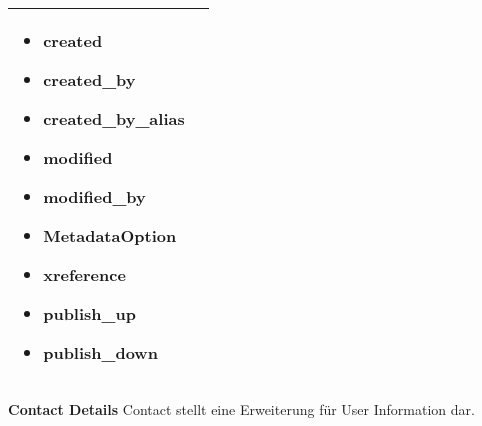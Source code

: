 \begin{minipage}{0.7\textwidth}
\begin{tabular}{|p{} | p{}|}
\begin{itemize}
 \item  created
 \item  created\_by
 \item  created\_by\_alias
 \item  modified
 \item  modified\_by
 \item  MetadataOption
 \item  xreference
 \item  publish\_up
 \item  publish\_down
\end{itemize}
\\
\hline
\end{tabular}
\end{minipage}


\textbf{Contact Details}
Contact stellt eine Erweiterung für User Information dar.

